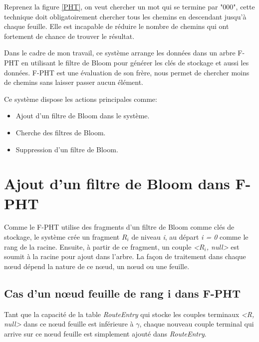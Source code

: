 \documentclass[a4paper,11pt]{report}
\begin{document}
	Reprenez la figure \ref{PHT}, on veut chercher un mot qui se termine par "000", cette technique doit obligatoirement chercher tous les chemins en descendant jusqu'à chaque feuille. Elle est incapable de réduire le nombre de chemins qui ont fortement de chance de trouver le résultat. 
	
	Dans le cadre de mon travail, ce système arrange les données dans un arbre F-PHT en utilisant le filtre de Bloom pour générer les clés de stockage et aussi les données. F-PHT est une évaluation de son frère, nous permet de chercher moins de chemins sans laisser passer aucun élément.
	
	Ce système dispose les actions principales comme:
	\begin{itemize}
		\item Ajout d'un filtre de Bloom dans le système.
		\item Cherche des filtres de Bloom.
		\item Suppression d'un filtre de Bloom.
	\end{itemize}
	
\section{Ajout d'un filtre de Bloom dans F-PHT}
	Comme le F-PHT utilise des fragments d'un filtre de Bloom comme clés de stockage, le système crée un fragment \textit{$R_i$} de niveau \textit{i}, au départ \textit{i = 0} comme le rang de la racine. Ensuite, à partir de ce fragment, un couple \textit{<$R_i$, null>} est soumit à la racine pour ajout dans l'arbre. La façon de traitement dans chaque nœud dépend la nature de ce nœud, un nœud ou une feuille.

\subsection{Cas d'un nœud feuille de rang i dans F-PHT}
	Tant que la capacité de la table \textit{RouteEntry} qui stocke les couples terminaux \textit{<R, null>} dans ce nœud feuille est inférieure à $\gamma$, chaque nouveau couple terminal qui arrive sur ce nœud feuille est simplement ajouté dans \textit{RouteEntry}.
\end{document}
